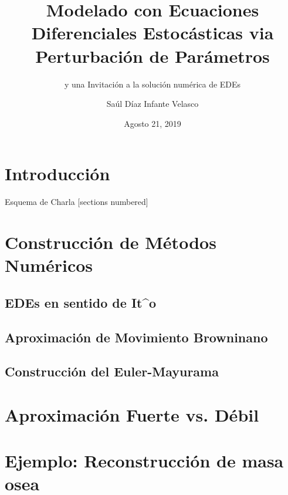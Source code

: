 \documentclass[10pt]{beamer}
\title{Modelado con Ecuaciones Diferenciales
    Estoc\'asticas via Perturbaci\'on de Par\'ametros}
\subtitle{y una Invitaci\'on a la soluci\'on num\'erica de EDEs}
\date{Agosto 21, 2019}
\author{Sa\'ul D\'iaz Infante Velasco}
\institute{CONACYT-Universidad de Sonora}
\begin{document}
    \maketitle
    \section*{Introducci\'on}
        
    \begin{frame}{Esquema de Charla}
        [sections numbered]
        \tableofcontents[hideallsubsections]
    \end{frame}
    \section{Construcción de Métodos Numéricos}
        \subsection{EDEs en sentido de It^o}
            
            
        \subsection{Aproximaci\'on de Movimiento Browninano}
            
        \subsection{Construcci\'on del Euler-Mayurama}
        \section{Aproximaci\'on Fuerte vs. D\'ebil}
            
    \section{Ejemplo: Reconstrucción de masa osea}
        
        
        
        
        
        
        
\end{document}
